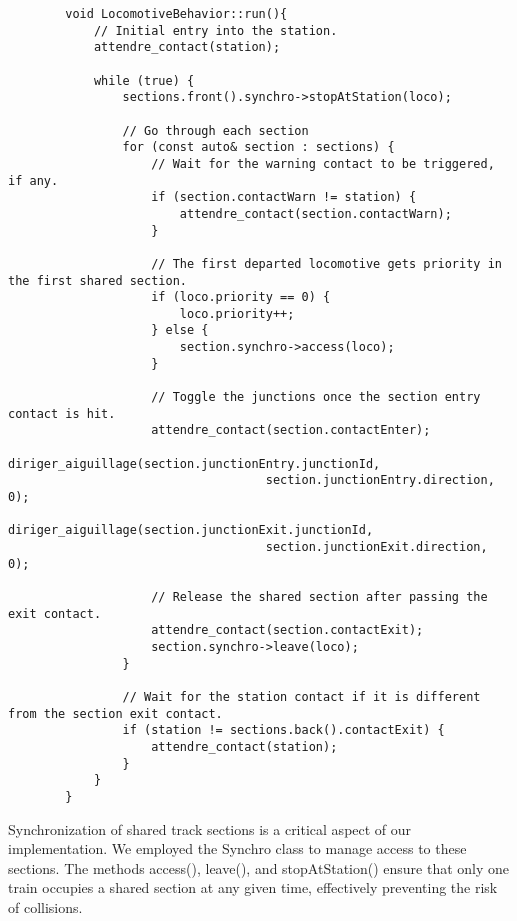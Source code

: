 \documentclass{article}
\begin{document}
    \begin{lstlisting}
        void LocomotiveBehavior::run(){
            // Initial entry into the station.
            attendre_contact(station);

            while (true) {
                sections.front().synchro->stopAtStation(loco);

                // Go through each section
                for (const auto& section : sections) {
                    // Wait for the warning contact to be triggered, if any.
                    if (section.contactWarn != station) {
                        attendre_contact(section.contactWarn);
                    }

                    // The first departed locomotive gets priority in the first shared section.
                    if (loco.priority == 0) {
                        loco.priority++;
                    } else {
                        section.synchro->access(loco);
                    }

                    // Toggle the junctions once the section entry contact is hit.
                    attendre_contact(section.contactEnter);
                    diriger_aiguillage(section.junctionEntry.junctionId,
                                    section.junctionEntry.direction, 0);
                    diriger_aiguillage(section.junctionExit.junctionId,
                                    section.junctionExit.direction, 0);

                    // Release the shared section after passing the exit contact.
                    attendre_contact(section.contactExit);
                    section.synchro->leave(loco);
                }

                // Wait for the station contact if it is different from the section exit contact.
                if (station != sections.back().contactExit) {
                    attendre_contact(station);
                }
            }
        }
    \end{lstlisting}

    \pagebreak

    Synchronization of shared track sections is a critical aspect of our implementation. We employed the Synchro class to manage access to these sections. The methods access(), leave(), and stopAtStation() ensure that only one train occupies a shared section at any given time, effectively preventing the risk of collisions.
\end{document}
